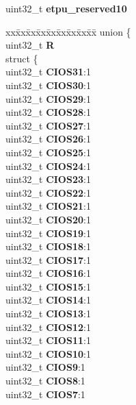 \begin{DoxyCompactItemize}
\begin{tabbing}
\end{tabbing}\item 
\mbox{\label{structETPU__tag_aa52909b7417c7113072ce283a4e99516}} 
uint32\+\_\+t {\bfseries etpu\+\_\+reserved10}
\item 
\mbox{\label{structETPU__tag_a34f94a0e484c6b9c658aee9d1dc46c26}} 
\begin{tabbing}
xx\=xx\=xx\=xx\=xx\=xx\=xx\=xx\=xx\=\kill
union \{\\
\>uint32\_t {\bfseries R}\\
\>struct \{\\
\>\>uint32\_t {\bfseries CIOS31}:1\\
\>\>uint32\_t {\bfseries CIOS30}:1\\
\>\>uint32\_t {\bfseries CIOS29}:1\\
\>\>uint32\_t {\bfseries CIOS28}:1\\
\>\>uint32\_t {\bfseries CIOS27}:1\\
\>\>uint32\_t {\bfseries CIOS26}:1\\
\>\>uint32\_t {\bfseries CIOS25}:1\\
\>\>uint32\_t {\bfseries CIOS24}:1\\
\>\>uint32\_t {\bfseries CIOS23}:1\\
\>\>uint32\_t {\bfseries CIOS22}:1\\
\>\>uint32\_t {\bfseries CIOS21}:1\\
\>\>uint32\_t {\bfseries CIOS20}:1\\
\>\>uint32\_t {\bfseries CIOS19}:1\\
\>\>uint32\_t {\bfseries CIOS18}:1\\
\>\>uint32\_t {\bfseries CIOS17}:1\\
\>\>uint32\_t {\bfseries CIOS16}:1\\
\>\>uint32\_t {\bfseries CIOS15}:1\\
\>\>uint32\_t {\bfseries CIOS14}:1\\
\>\>uint32\_t {\bfseries CIOS13}:1\\
\>\>uint32\_t {\bfseries CIOS12}:1\\
\>\>uint32\_t {\bfseries CIOS11}:1\\
\>\>uint32\_t {\bfseries CIOS10}:1\\
\>\>uint32\_t {\bfseries CIOS9}:1\\
\>\>uint32\_t {\bfseries CIOS8}:1\\
\>\>uint32\_t {\bfseries CIOS7}:1\\

\end{tabbing}
\end{DoxyCompactItemize}
